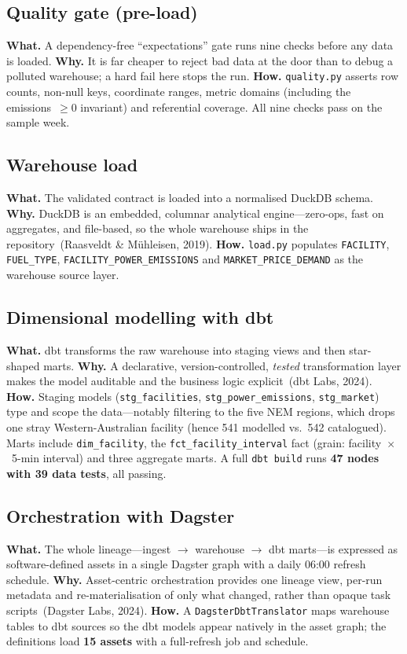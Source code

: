 \documentclass[onecolumn,11pt]{IEEEtran}
\begin{document}
\subsection{Quality gate (pre-load)}
\textbf{What.} A dependency-free ``expectations'' gate runs nine checks before
any data is loaded. \textbf{Why.} It is far cheaper to reject bad data at the
door than to debug a polluted warehouse; a hard fail here stops the run.
\textbf{How.} \texttt{quality.py} asserts row counts, non-null keys, coordinate
ranges, metric domains (including the emissions~$\geq 0$ invariant) and
referential coverage. All nine checks pass on the sample week.

\subsection{Warehouse load}
\textbf{What.} The validated contract is loaded into a normalised DuckDB schema.
\textbf{Why.} DuckDB is an embedded, columnar analytical engine---zero-ops, fast
on aggregates, and file-based, so the whole warehouse ships in the
repository~(Raasveldt \& M\"uhleisen, 2019). \textbf{How.} \texttt{load.py}
populates \texttt{FACILITY}, \texttt{FUEL\_TYPE},
\texttt{FACILITY\_POWER\_EMISSIONS} and \texttt{MARKET\_PRICE\_DEMAND} as the
warehouse source layer.

\subsection{Dimensional modelling with dbt}
\textbf{What.} dbt transforms the raw warehouse into staging views and then
star-shaped marts. \textbf{Why.} A declarative, version-controlled,
\emph{tested} transformation layer makes the model auditable and the business
logic explicit~(dbt Labs, 2024). \textbf{How.} Staging models
(\texttt{stg\_facilities}, \texttt{stg\_power\_emissions}, \texttt{stg\_market})
type and scope the data---notably filtering to the five NEM regions, which drops
one stray Western-Australian facility (hence 541 modelled vs.\ 542 catalogued).
Marts include \texttt{dim\_facility}, the \texttt{fct\_facility\_interval} fact
(grain: facility~$\times$~5-min interval) and three aggregate marts. A full
\texttt{dbt build} runs \textbf{47 nodes with 39 data tests}, all passing.

\subsection{Orchestration with Dagster}
\textbf{What.} The whole lineage---ingest $\rightarrow$ warehouse $\rightarrow$
dbt marts---is expressed as software-defined assets in a single Dagster graph
with a daily 06:00 refresh schedule. \textbf{Why.} Asset-centric orchestration
provides one lineage view, per-run metadata and re-materialisation of only what
changed, rather than opaque task scripts~(Dagster Labs, 2024). \textbf{How.} A
\texttt{DagsterDbtTranslator} maps warehouse tables to dbt sources so the dbt
models appear natively in the asset graph; the definitions load \textbf{15
assets} with a full-refresh job and schedule.
\end{document}
